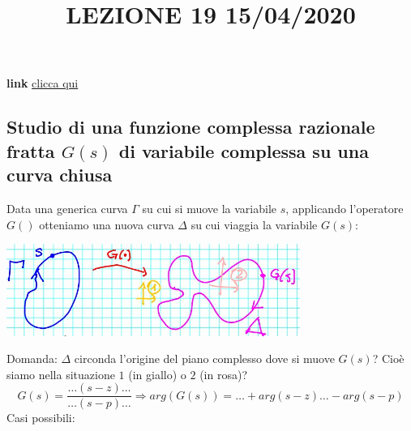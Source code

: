 \newline
\title{LEZIONE 19 15/04/2020}\newline
\textbf{link} \href{https://web.microsoftstream.com/video/8edecaf9-c042-4da8-905e-0412c9f62daa?list=user&userId=faa91214-a6f5-40d7-8875-253fd49b8ce1}{clicca qui}
\subsection{Studio di una funzione complessa razionale fratta $G(s)$ di variabile complessa su una curva chiusa}
Data una generica curva $\Gamma$ su cui si muove la variabile $s$, applicando l'operatore $G()$ otteniamo una nuova curva $\Delta$ su cui viaggia la variabile $G(s)$:
\begin{center}
    \includegraphics[height=3cm]{../lezione19/img1.JPG}
\end{center}
Domanda: $\Delta$ circonda l'origine del piano complesso dove si muove $G(s)$? Cioè siamo nella situazione $1$ (in giallo) o $2$ (in rosa)? \newline
\[
    G(s) = \frac{\dots (s-z) \dots}{\dots (s-p) \dots} \Rightarrow arg(G(s)) = \dots + arg(s-z) \dots - arg(s-p)
\]
Casi possibili:
